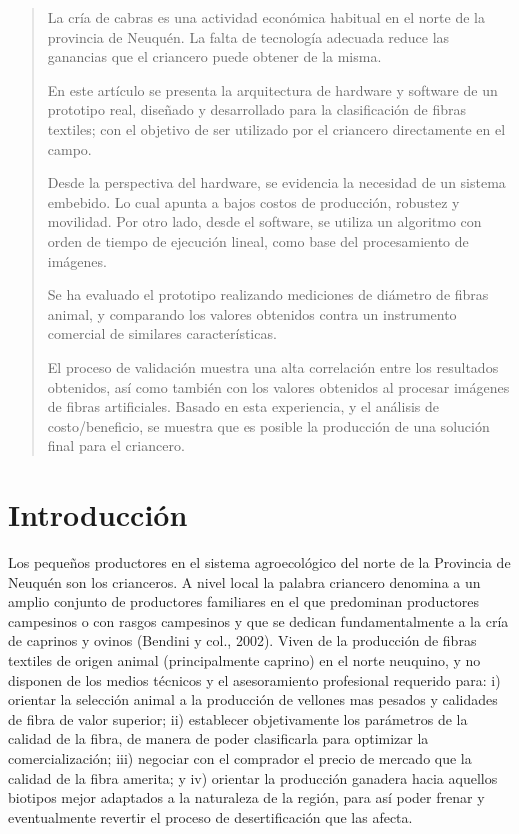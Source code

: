 \documentclass[runningheads,a4paper]{llncs}
\begin{document}
\begin{abstract}

La cría de cabras es una actividad económica habitual en el norte de la provincia de Neuquén. 
La falta de tecnología adecuada reduce las ganancias que el criancero puede obtener de la misma. 

En este artículo se presenta la arquitectura de hardware y 
software de un prototipo real, diseñado y desarrollado para la clasificación 
de fibras textiles; con el objetivo de ser utilizado por el criancero directamente en el campo. 

Desde la perspectiva del hardware, se evidencia la necesidad de un sistema
embebido. Lo cual apunta a bajos costos de producción, robustez y movilidad. 
Por otro lado, desde el software, se utiliza un algoritmo con orden de
tiempo de ejecución lineal, como base del procesamiento de imágenes. 

Se ha evaluado el prototipo realizando mediciones de diámetro de fibras animal,
y comparando los valores obtenidos contra un instrumento comercial de similares
características.

El proceso de validación muestra una alta correlación entre los resultados
obtenidos, así como también con 
los valores obtenidos al procesar imágenes de fibras artificiales. 
Basado en esta experiencia, y 
el análisis de costo/beneficio, se muestra que es posible la producción de una solución final para el criancero. 
\end{abstract}


\section{Introducción}

Los pequeños productores en el sistema agroecológico del norte de la Provincia de Neuquén son los crianceros. A nivel local la palabra criancero denomina a un amplio conjunto de productores familiares en el que predominan productores campesinos o con rasgos campesinos y que se dedican fundamentalmente a la cría de caprinos y ovinos (Bendini y col., 2002). Viven de la producción de fibras textiles de origen animal (principalmente caprino) en el norte neuquino, y no disponen de los medios técnicos y el asesoramiento profesional requerido para: i) orientar la selección animal a la producción de vellones mas pesados y calidades de fibra de valor superior; ii) establecer objetivamente los parámetros de la calidad de la fibra, de manera de poder clasificarla para optimizar la comercialización; iii) negociar con el comprador el precio de mercado que la calidad de la fibra amerita; y iv) orientar la producción ganadera hacia aquellos biotipos mejor adaptados a la naturaleza de la región, para así poder frenar y eventualmente revertir el proceso de desertificación que las afecta.
\end{document}
